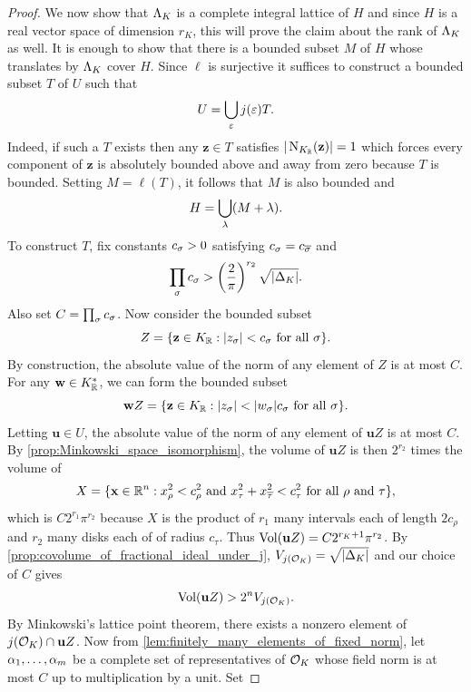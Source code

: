 \begin{proof}
      We now show that \(\Lambda_{K}\) is a complete integral lattice of \(H\) and since \(H\) is a real vector space of dimension \(r_{K}\), this will prove the claim about the rank of \(\Lambda_{K}\) as well. It is enough to show that there is a bounded subset \(M\) of \(H\) whose translates by \(\Lambda_{K}\) cover \(H\). Since \(\ell\) is surjective it suffices to construct a bounded subset \(T\) of \(U\) such that
      \[
        U = \bigcup_{\varepsilon}j(\varepsilon)T.
      \]
      Indeed, if such a \(T\) exists then any \(\mathbf{z} \in T\) satisfies \(|\operatorname{\mathrm{N}}_{K_{\mathbb{R}}}(\mathbf{z})| = 1\) which forces every component of \(\mathbf{z}\) is absolutely bounded above and away from zero because \(T\) is bounded. Setting \(M = \ell(T)\), it follows that \(M\) is also bounded and
      \[
        H = \bigcup_{\lambda}(M+\lambda).
      \]
      To construct \(T\), fix constants \(c_{\sigma} > 0\) satisfying \(c_{\sigma} = c_{\overline{\sigma}}\) and
      \[
        \prod_{\sigma}c_{\sigma} > \left(\frac{2}{\pi}\right)^{r_{2}}\sqrt{|\Delta_{K}|}.
      \]
      Also set \(C = \prod_{\sigma}c_{\sigma}\). Now consider the bounded subset
      \[
        Z = \{\mathbf{z} \in K_{\mathbb{R}}:|z_{\sigma}| < c_{\sigma} \text{ for all } \sigma\}.
      \]
      By construction, the absolute value of the norm of any element of \(Z\) is at most \(C\). For any \(\mathbf{w} \in K_{\mathbb{R}}^{\ast}\), we can form the bounded subset
      \[
        \mathbf{w}Z = \{\mathbf{z} \in K_{\mathbb{R}}:|z_{\sigma}| < |w_{\sigma}|c_{\sigma} \text{ for all } \sigma\}.
      \]
      Letting \(\mathbf{u} \in U\), the absolute value of the norm of any element of \(\mathbf{u}Z\) is at most \(C\). By \cref{prop:Minkowski_space_isomorphism}, the volume of \(\mathbf{u}Z\) is then \(2^{r_{2}}\) times the volume of
      \[
        X = \{\mathbf{x} \in \mathbb{R}^{n}:x_{\rho}^{2} < c_{\rho}^{2} \text{ and } x_{\tau}^{2}+x_{\overline{\tau}}^{2} < c_{\tau}^{2} \text{ for all } \rho \text{ and } \tau\},
      \]
      which is \(C2^{r_{1}}\pi^{r_{2}}\) because \(X\) is the product of \(r_{1}\) many intervals each of length \(2c_{\rho}\) and \(r_{2}\) many disks each of of radius \(c_{\tau}\). Thus \(\operatorname{\mathrm{Vol}}(\mathbf{u}Z) = C2^{r_{K}+1}\pi^{r_{2}}\). By \cref{prop:covolume_of_fractional_ideal_under_j}, \(V_{j(\mathcal{O}_{K})} = \sqrt{|\Delta_{K}|}\) and our choice of \(C\) gives
      \[
        \operatorname{\mathrm{Vol}}(\mathbf{u}Z) > 2^{n}V_{j(\mathcal{O}_{K})}.
      \]
      By Minkowski's lattice point theorem, there exists a nonzero element of \(j(\mathcal{O}_{K}) \cap \mathbf{u}Z\). Now from \cref{lem:finitely_many_elements_of_fixed_norm}, let \(\alpha_{1},\ldots,\alpha_{m}\) be a complete set of representatives of \(\mathcal{O}_{K}\) whose field norm is at most \(C\) up to multiplication by a unit. Set

\end{proof}
